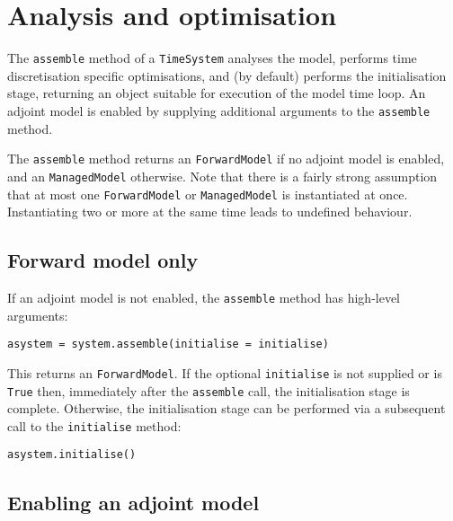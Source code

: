 \documentclass[a4paper]{book}
\begin{document}
\section{Analysis and optimisation}\label{sect:assembly}

The \verb+assemble+ method of a \verb+TimeSystem+ analyses the model, performs
time discretisation specific optimisations, and (by default) performs the
initialisation stage, returning an object suitable for execution of the model
time loop. An adjoint model is enabled by supplying additional arguments to the
\verb+assemble+ method.

The \verb+assemble+ method returns an \verb+ForwardModel+ if no adjoint model is
enabled, and an \verb+ManagedModel+ otherwise. Note that there is a fairly
strong assumption that at most one \verb+ForwardModel+ or
\verb+ManagedModel+ is instantiated at once. Instantiating two or more at the
same time leads to undefined behaviour.

\subsection{Forward model only}\label{sect:forward_assembly}

If an adjoint model is not enabled, the \verb+assemble+ method has high-level
arguments:
\begin{lstlisting}
asystem = system.assemble(initialise = initialise)
\end{lstlisting}
This returns an \verb+ForwardModel+. If the optional \verb+initialise+ is not
supplied or is \verb+True+ then, immediately after the \verb+assemble+ call, the
initialisation stage is complete. Otherwise, the initialisation stage can be
performed via a subsequent call to the \verb+initialise+ method:
\begin{lstlisting}
asystem.initialise()
\end{lstlisting}

\subsection{Enabling an adjoint model}\label{sect:adjoint_assembly}
\end{document}
